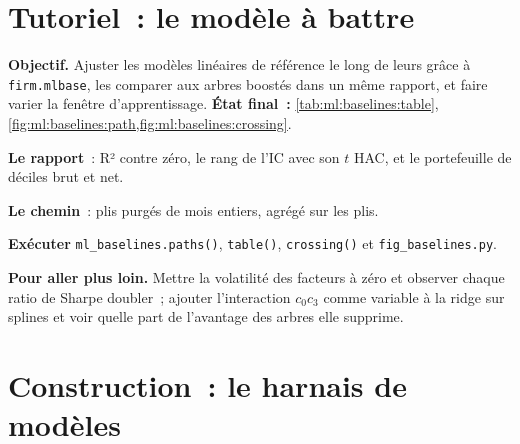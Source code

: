 \section{Tutoriel~: le modèle à battre}\label{tut:ml:linear-and-regularised-baselines:tut}

\begin{tutorial}
\textbf{Objectif.} Ajuster les modèles linéaires de référence le long de leurs  grâce à \texttt{firm.mlbase}, les comparer
aux arbres boostés dans un même rapport, et faire varier la fenêtre d'apprentissage. \textbf{État final~:} \cref{tab:ml:baselines:table},
\cref{fig:ml:baselines:path,fig:ml:baselines:crossing}.
\begin{tutsteps}
\item \textbf{Le rapport}~: R² contre zéro, le rang de l'IC avec son $t$ HAC, et le portefeuille de déciles brut et net.
\label{lst:ml:baselines:report}
\item \textbf{Le chemin}~: plis purgés de mois entiers,  agrégé sur les plis.
\label{lst:ml:baselines:path}
\item \textbf{Exécuter} \texttt{ml\_baselines.paths()}, \texttt{table()}, \texttt{crossing()} et \texttt{fig\_baselines.py}.
\end{tutsteps}
\textbf{Pour aller plus loin.} Mettre la volatilité des facteurs à zéro et observer chaque ratio de Sharpe doubler~; ajouter
l'interaction $c_0c_3$ comme variable à la ridge sur splines et voir quelle part de l'avantage des arbres elle supprime.
\end{tutorial}

\section{Construction~: le harnais de modèles}\label{bld:ml:linear-and-regularised-baselines:mlbase}

